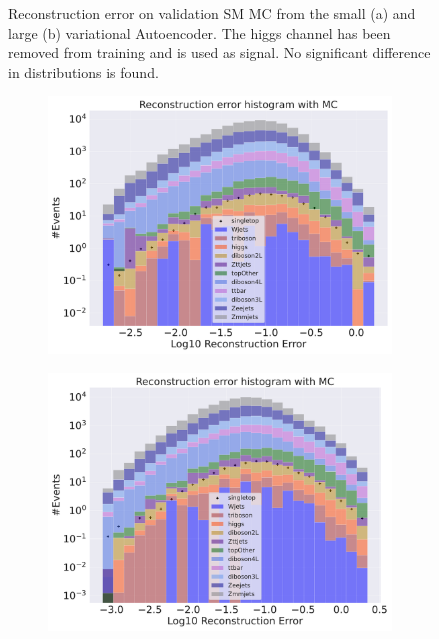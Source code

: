 \begin{figure}[H]
\begin{subfigure}{.45\textwidth}
        \caption{ }
        \label{fig:vae_big_higgs}
    \end{subfigure}
    \hfill  
    \caption[VAE | Reconstruction error using Higgs channel as signal]{Reconstruction error on validation SM MC from the small (a) and large (b) variational Autoencoder. The higgs channel has been removed from training and 
    is used as signal. No significant difference in distributions is found. }
    \label{fig:vae_big_channel_1}
\end{figure}

\begin{figure}[H]
    \centering
    \begin{subfigure}{.45\textwidth}
        \includegraphics[width=\textwidth]{Figures/VAE_testing/small/b_data_recon_big_rm3_feats_sig_singletop.pdf}
        \caption{ }
        \label{fig:vae_small_singletop}
    \end{subfigure}
    \hfill
    \begin{subfigure}{.45\textwidth}
        \includegraphics[width=\textwidth]{Figures/VAE_testing/big/b_data_recon_big_rm3_feats_sig_singletop.pdf}

\end{subfigure}
\end{figure}
